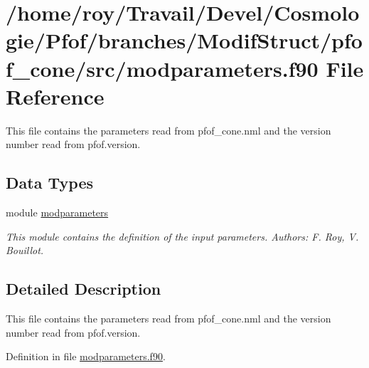 \hypertarget{pfof__cone_2src_2modparameters_8f90}{\section{/home/roy/\-Travail/\-Devel/\-Cosmologie/\-Pfof/branches/\-Modif\-Struct/pfof\-\_\-cone/src/modparameters.f90 File Reference}
\label{pfof__cone_2src_2modparameters_8f90}
}


This file contains the parameters read from pfof\-\_\-cone.\-nml and the version number read from pfof.\-version.  


\subsection*{Data Types}
\begin{DoxyCompactItemize}
\item 
module \hyperlink{classmodparameters}{modparameters}
\begin{DoxyCompactList}\small\item\em This module contains the definition of the input parameters. Authors\-: F. Roy, V. Bouillot. \end{DoxyCompactList}\end{DoxyCompactItemize}


\subsection{Detailed Description}
This file contains the parameters read from pfof\-\_\-cone.\-nml and the version number read from pfof.\-version. 

Definition in file \hyperlink{pfof__cone_2src_2modparameters_8f90_source}{modparameters.\-f90}.

